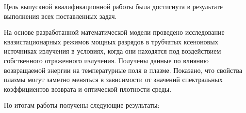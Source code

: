 


Цель выпускной квалификационной работы была достигнута в результате выполнения всех поставленных задач.

На основе разработанной математической модели проведено исследование квазистационарных режимов мощных разрядов в трубчатых ксеноновых источниках излучения в условиях, когда они находятся под воздействием собственного отраженного излучения. Получены данные по влиянию возвращаемой энергии на температурные поля в плазме. Показано, что свойства плазмы могут заметно меняться в зависимости от значений спектральных коэффициентов возврата и оптической плотности среды.

По итогам работы получены следующие результаты:

